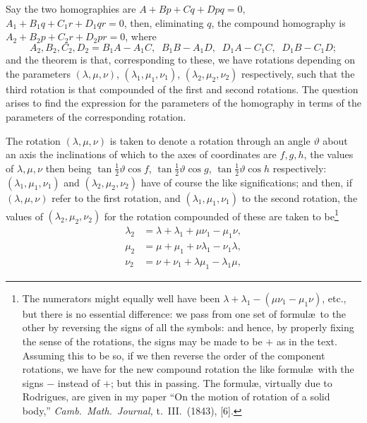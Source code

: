 \documentclass[11pt,a4paper]{article}
\begin{document}
Say the two homographies are $A + Bp + Cq + Dpq = 0$, $A_{1} + B_{1}q + C_{1}r + D_{1}qr = 0$, then, eliminating $q$, the compound homography is $A_{2} + B_{2}p + C_{2}r + D_{2}pr = 0$, where
\[
A_{2}, B_{2}, C_{2}, D_{2} = B_{1}A - A_{1}C,\;\; B_{1}B - A_{1}D,\;\; D_{1}A - C_{1}C,\;\; D_{1}B - C_{1}D;
\]
and the theorem is that, corresponding to these, we have rotations depending on the parameters $(\lambda, \mu, \nu)$, $(\lambda_{1}, \mu_{1}, \nu_{1})$, $(\lambda_{2}, \mu_{2}, \nu_{2})$ respectively, such that the third rotation is that compounded of the first and second rotations. The question arises to find the expression for the parameters of the homography in terms of the parameters of the corresponding rotation.

The rotation $(\lambda, \mu, \nu)$ is taken to denote a rotation through an angle $\vartheta$ about an axis the inclinations of which to the axes of coordinates are $f, g, h$, the values of $\lambda, \mu, \nu$ then being $\tan\tfrac{1}{2}\vartheta \cos f$, $\tan\tfrac{1}{2}\vartheta \cos g$, $\tan\tfrac{1}{2}\vartheta \cos h$ respectively: $(\lambda_{1}, \mu_{1}, \nu_{1})$ and $(\lambda_{2}, \mu_{2}, \nu_{2})$ have of course the like significations; and then, if $(\lambda, \mu, \nu)$ refer to the first rotation, and $(\lambda_{1}, \mu_{1}, \nu_{1})$ to the second rotation, the values of $(\lambda_{2}, \mu_{2}, \nu_{2})$ for the rotation compounded of these are taken to be\footnote{The numerators might equally well have been $\lambda + \lambda_{1} - (\mu\nu_{1} - \mu_{1}\nu)$, etc., but there is no essential difference: we pass from one set of formul\ae\ to the other by reversing the signs of all the symbols: and hence, by properly fixing the sense of the rotations, the signs may be made to be $+$ as in the text. Assuming this to be so, if we then reverse the order of the component rotations, we have for the new compound rotation the like formul\ae\ with the signs $-$ instead of $+$; but this in passing. The formul\ae, virtually due to Rodrigues, are given in my paper ``On the motion of rotation of a solid body,'' \emph{Camb.\ Math.\ Journal,} t.~III.\ (1843), [6].}
\[
\begin{aligned}
\lambda_{2} &= \lambda + \lambda_{1} + \mu\nu_{1} - \mu_{1}\nu,\\
\mu_{2} &= \mu + \mu_{1} + \nu\lambda_{1} - \nu_{1}\lambda,\\
\nu_{2} &= \nu + \nu_{1} + \lambda\mu_{1} - \lambda_{1}\mu,
\end{aligned}
\]

\newpage
\end{document}
